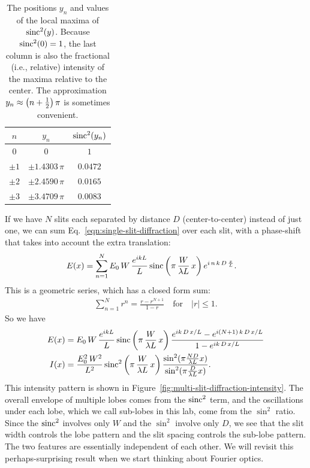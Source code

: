 \documentclass[]{manual}
\begin{document}
    \begin{table}
        \centering

        \begin{tabular}{ c c c }
            $n$ & $y_n$ & $\operatorname{sinc}^2(y_n)$ \\
            \hline
            $0$ & $0$ & $1$ \\
            $\pm 1$ & $\pm 1.4303 \, \pi$ & $0.0472$ \\
            $\pm 2$ & $\pm 2.4590 \, \pi$ & $0.0165$ \\
            $\pm 3$ & $\pm 3.4709 \, \pi$ & $0.0083$ \\
        \end{tabular}

        \caption{
            The positions $y_n$ and values of the local maxima of $\operatorname{sinc}^2(y)$.
            Because $\operatorname{sinc}^2(0) = 1$, the last column is also the fractional (i.e., relative) intensity of the maxima relative to the center.
            The approximation $y_n \approx \qty(n + \frac{1}{2}) \, \pi$ is sometimes convenient.
        }

        \label{tab:sinc-squared-maxima}
    \end{table}

    If we have $N$ slits each separated by distance $D$ (center-to-center) instead of just one, we can sum Eq.~\eqref{eqn:single-slit-diffraction} over each slit, with a phase-shift that takes into account the extra translation:
    \begin{align}
        E(x) &= \sum_{n=1}^N E_0 \, W \, \frac{e^{i k L}}{L} \operatorname{sinc}\qty(\pi \, \frac{W}{\lambda L} \, x) \, e^{i \, n \, k \, D \, \frac{x}{L}}.
    \end{align}
    This is a geometric series, which has a closed form sum:
    \begin{align}
        \sum_{n=1}^Nr^n=\frac{r-r^{N+1}}{1-r} \quad \mathrm{for} \quad |r| \leq 1.
    \end{align}
    So we have
    \begin{align} \label{eqn:multi-slit-diffraction}
        E(x) &= E_0 \, W \, \frac{e^{i k L}}{L} \operatorname{sinc}\qty(\pi \, \frac{W}{\lambda L} \, x) \, \frac{e^{i k \, D \, x / L} - e^{i (N + 1) \, k \, D \, x / L}}{1 - e^{i k \, D \, x / L}} \nonumber \\
        I(x) &= \frac{E_0^2 \, W^2}{L^2} \operatorname{sinc}^2\qty(\pi \, \frac{W}{\lambda L} \, x) \, \frac{\sin^2(\pi \frac{N D}{\lambda L} x)}{\sin^2(\pi \frac{D}{\lambda L} x)}.
    \end{align}
    This intensity pattern is shown in Figure~\ref{fig:multi-slit-diffraction-intensity}.
    The overall envelope of multiple lobes comes from the $\operatorname{sinc}^2$ term, and the oscillations under each lobe, which we call sub-lobes in this lab, come from the $\sin^2$ ratio.
    Since the $\operatorname{sinc}^2$ involves only $W$ and the $\sin^2$ involve only $D$, we see that the slit width controls the lobe pattern and the slit spacing controls the sub-lobe pattern.
    The two features are essentially independent of each other.
    We will revisit this perhaps-surprising result when we start thinking about Fourier optics.
\end{document}
